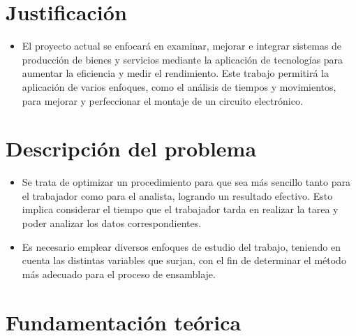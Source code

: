    \section{Justificación}
    
    \begin{itemize}
        \item El proyecto actual se enfocará en examinar, mejorar e integrar sistemas de producción de bienes y servicios mediante la aplicación de tecnologías para aumentar la eficiencia y medir el rendimiento. Este trabajo permitirá la aplicación de varios enfoques, como el análisis de tiempos y movimientos, para mejorar y perfeccionar el montaje de un circuito electrónico.
        \cite{freivalds2014ingenieria}
    \end{itemize}
    \section{Descripción del problema}
    \begin{itemize}
        \item Se trata de optimizar un procedimiento para que sea más sencillo tanto para el trabajador como para el analista, logrando un resultado efectivo. Esto implica considerar el tiempo que el trabajador tarda en realizar la tarea y poder analizar los datos correspondientes.
        \item Es necesario emplear diversos enfoques de estudio del trabajo, teniendo en cuenta las distintas variables que surjan, con el fin de determinar el método más adecuado para el proceso de ensamblaje.
    \end{itemize}
    
    
    \section{Fundamentación teórica}
    
